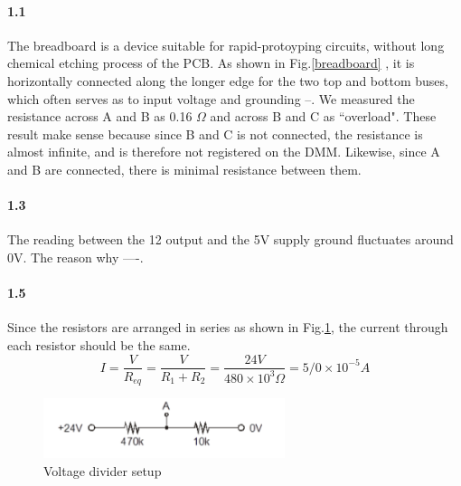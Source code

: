 \documentclass[10pt,letterpaper,oneside] {article}
\begin{document}
\paragraph{\textbf{1.1}}
The breadboard is a device suitable for rapid-protoyping circuits, without long chemical etching process of the PCB.  As shown in Fig.\ref{breadboard} , it is horizontally connected along the longer edge for the two top and bottom buses, which often serves as to input voltage and grounding --. We measured the resistance across A and B as 0.16 $\Omega$ and across B and C as ``overload".  These result make sense because since B and C is not connected, the resistance is almost infinite, and is therefore not registered on the DMM. Likewise, since A and B are connected, there is minimal resistance between them.
\paragraph{\textbf{1.3}} 
The reading between the 12 output and the 5V supply ground fluctuates around 0V. The reason why ----.
\paragraph{\textbf{1.5}} \label{1_5}
Since the resistors are arranged in series as shown in Fig.\ref{voltage_divider}, the current through each resistor should be the same. 
\begin{equation}
I = \frac{V}{R_{eq}}=\frac{V}{R_1+R_2}=\frac{24V}{480\times10^3\Omega
}= 5/0\times10^{-5}A 
\end{equation}
\begin{figure}[h!]
\center
\includegraphics[width=200pt]{figure/d_voltage_divider}
\caption{Voltage divider setup}
\label{voltage_divider}
\end{figure}
\end{document}
